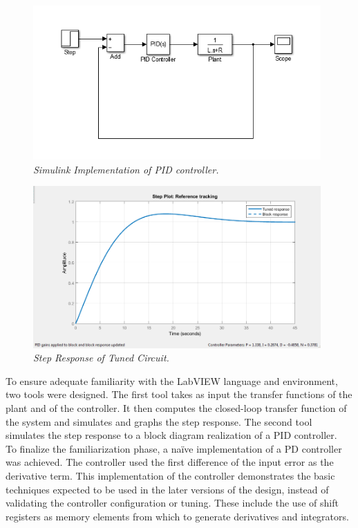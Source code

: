 \documentclass{article}
\begin{document}
\begin{figure}[!ht]
\centering 
\includegraphics[width=11cm]{fig_9.png}
\caption{\small \sl Simulink Implementation of PID controller.}  
\end{figure}

\begin{figure}[!ht]
\centering 
\includegraphics[width=11cm]{fig_10.png}
\caption{\small \sl Step Response of Tuned Circuit.}  
\end{figure}

\noindent To ensure adequate familiarity with the LabVIEW language and environment, two tools were designed. The first tool takes as input the transfer functions of the plant and of the controller. It then computes the closed-loop transfer function of the system and simulates and graphs the step response. The second tool simulates the step response to a block diagram realization of a PID controller. \\

\noindent To finalize the familiarization phase, a naïve implementation of a PD controller was achieved. The controller used the first difference of the input error as the derivative term. This implementation of the controller demonstrates the basic techniques expected to be used in the later versions of the design, instead of validating the controller configuration or tuning. These include the use of shift registers as memory elements from which to generate derivatives and integrators.
\end{document}
